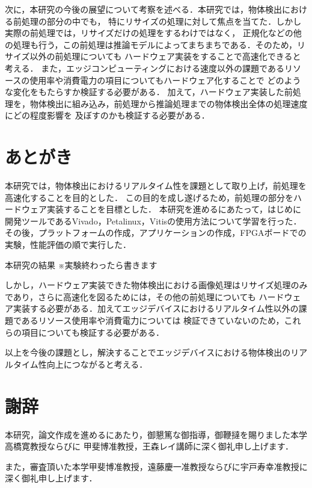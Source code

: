 \documentclass[11pt,a4j]{jreport}
\begin{document}
次に，本研究の今後の展望について考察を述べる．本研究では，物体検出における前処理の部分の中でも，
特にリサイズの処理に対して焦点を当てた．しかし実際の前処理では，リサイズだけの処理をするわけではなく，
正規化などの他の処理も行う，この前処理は推論モデルによってまちまちである．そのため，リサイズ以外の前処理についても
ハードウェア実装をすることで高速化できると考える．
また，エッジコンピューティングにおける速度以外の課題であるリソースの使用率や消費電力の項目についてもハードウェア化することで
どのような変化をもたらすか検証する必要がある．
加えて，ハードウェア実装した前処理を，物体検出に組み込み，前処理から推論処理までの物体検出全体の処理速度にどの程度影響を
及ぼすのかも検証する必要がある．
\chapter{あとがき}
本研究では，物体検出におけるリアルタイム性を課題として取り上げ，前処理を高速化することを目的とした．
この目的を成し遂げるため，前処理の部分をハードウェア実装することを目標とした．
本研究を進めるにあたって，はじめに開発ツールであるVivado，Petalinux，Vitisの使用方法について学習を行った．
その後，プラットフォームの作成，アプリケーションの作成，FPGAボードでの実験，性能評価の順で実行した．

本研究の結果
※実験終わったら書きます

しかし，ハードウェア実装できた物体検出における画像処理はリサイズ処理のみであり，さらに高速化を図るためには，その他の前処理についても
ハードウェア実装する必要がある．加えてエッジデバイスにおけるリアルタイム性以外の課題であるリソース使用率や消費電力については
検証できていないのため，これらの項目についても検証する必要がある．

以上を今後の課題とし，解決することでエッジデバイスにおける物体検出のリアルタイム性向上につながると考える．

\chapter*{謝辞} %
本研究，論文作成を進めるにあたり，御懇篤な御指導，御鞭撻を賜りました本学高橋寛教授ならびに
甲斐博准教授，王森レイ講師に深く御礼申し上げます．

また，審査頂いた本学甲斐博准教授，遠藤慶一准教授ならびに宇戸寿幸准教授に深く御礼申し上げます．
\end{document}
